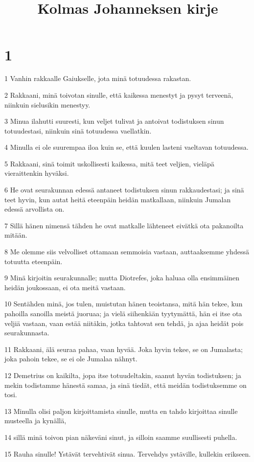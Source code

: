 

\title{Kolmas Johanneksen kirje}


\chapter{1}

\par 1 Vanhin rakkaalle Gaiukselle, jota minä totuudessa rakastan.
\par 2 Rakkaani, minä toivotan sinulle, että kaikessa menestyt ja pysyt terveenä, niinkuin sielusikin menestyy.
\par 3 Minua ilahutti suuresti, kun veljet tulivat ja antoivat todistuksen sinun totuudestasi, niinkuin sinä totuudessa vaellatkin.
\par 4 Minulla ei ole suurempaa iloa kuin se, että kuulen lasteni vaeltavan totuudessa.
\par 5 Rakkaani, sinä toimit uskollisesti kaikessa, mitä teet veljien, vieläpä vieraittenkin hyväksi.
\par 6 He ovat seurakunnan edessä antaneet todistuksen sinun rakkaudestasi; ja sinä teet hyvin, kun autat heitä eteenpäin heidän matkallaan, niinkuin Jumalan edessä arvollista on.
\par 7 Sillä hänen nimensä tähden he ovat matkalle lähteneet eivätkä ota pakanoilta mitään.
\par 8 Me olemme siis velvolliset ottamaan semmoisia vastaan, auttaaksemme yhdessä totuutta eteenpäin.
\par 9 Minä kirjoitin seurakunnalle; mutta Diotrefes, joka haluaa olla ensimmäinen heidän joukossaan, ei ota meitä vastaan.
\par 10 Sentähden minä, jos tulen, muistutan hänen teoistansa, mitä hän tekee, kun pahoilla sanoilla meistä juoruaa; ja vielä siihenkään tyytymättä, hän ei itse ota veljiä vastaan, vaan estää niitäkin, jotka tahtovat sen tehdä, ja ajaa heidät pois seurakunnasta.
\par 11 Rakkaani, älä seuraa pahaa, vaan hyvää. Joka hyvin tekee, se on Jumalasta; joka pahoin tekee, se ei ole Jumalaa nähnyt.
\par 12 Demetrius on kaikilta, jopa itse totuudeltakin, saanut hyvän todistuksen; ja mekin todistamme hänestä samaa, ja sinä tiedät, että meidän todistuksemme on tosi.
\par 13 Minulla olisi paljon kirjoittamista sinulle, mutta en tahdo kirjoittaa sinulle musteella ja kynällä,
\par 14 sillä minä toivon pian näkeväni sinut, ja silloin saamme suullisesti puhella.
\par 15 Rauha sinulle! Ystävät tervehtivät sinua. Tervehdys ystäville, kullekin erikseen.


